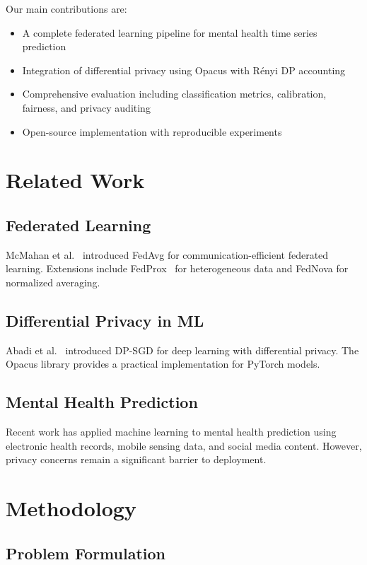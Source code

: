 \documentclass[11pt,a4paper]{article}
\begin{document}
Our main contributions are:
\begin{itemize}
    \item A complete federated learning pipeline for mental health time series prediction
    \item Integration of differential privacy using Opacus with Rényi DP accounting
    \item Comprehensive evaluation including classification metrics, calibration, fairness, and privacy auditing
    \item Open-source implementation with reproducible experiments
\end{itemize}

\section{Related Work}

\subsection{Federated Learning}
McMahan et al.~\cite{mcmahan2017} introduced FedAvg for communication-efficient federated learning. Extensions include FedProx~\cite{li2020fedprox} for heterogeneous data and FedNova for normalized averaging.

\subsection{Differential Privacy in ML}
Abadi et al.~\cite{abadi2016deep} introduced DP-SGD for deep learning with differential privacy. The Opacus library provides a practical implementation for PyTorch models.

\subsection{Mental Health Prediction}
Recent work has applied machine learning to mental health prediction using electronic health records, mobile sensing data, and social media content. However, privacy concerns remain a significant barrier to deployment.

\section{Methodology}

\subsection{Problem Formulation}
\end{document}
